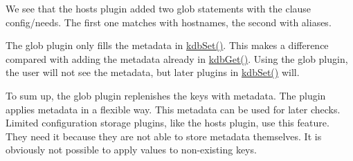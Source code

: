 We see that the {\ttfamily hosts} plugin added two glob statements with the clause {\ttfamily config/needs}. The first one matches with hostnames, the second with aliases.

The glob plugin only fills the metadata in {\ttfamily \mbox{\hyperlink{group__kdb_ga11436b058408f83d303ca5e996832bcf}{kdb\+Set()}}}. This makes a difference compared with adding the metadata already in {\ttfamily \mbox{\hyperlink{group__kdb_ga28e385fd9cb7ccfe0b2f1ed2f62453a1}{kdb\+Get()}}}. Using the glob plugin, the user will not see the metadata, but later plugins in {\ttfamily \mbox{\hyperlink{group__kdb_ga11436b058408f83d303ca5e996832bcf}{kdb\+Set()}}} will.

To sum up, the glob plugin replenishes the keys with metadata. The plugin applies metadata in a flexible way. This metadata can be used for later checks. Limited configuration storage plugins, like the {\ttfamily hosts} plugin, use this feature. They need it because they are not able to store metadata themselves. It is obviously not possible to apply values to non-\/existing keys. 